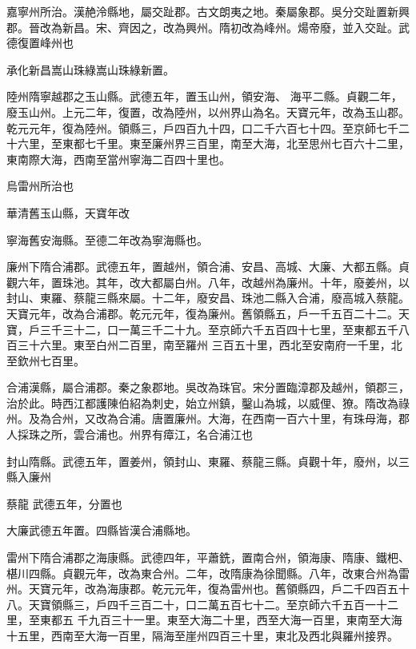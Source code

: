\begin{pinyinscope}
 嘉寧州所治。漢赩泠縣地，屬交趾郡。古文朗夷之地。秦屬象郡。吳分交趾置新興郡。晉改為新昌。宋、齊因之，改為興州。隋初改為峰州。煬帝廢，並入交趾。武德復置峰州也



 承化新昌嵩山珠綠嵩山珠綠新置。



 陸州隋寧越郡之玉山縣。武德五年，置玉山州，領安海、
 海平二縣。貞觀二年，廢玉山州。上元二年，復置，改為陸州，以州界山為名。天寶元年，改為玉山郡。乾元元年，復為陸州。領縣三，戶四百九十四，口二千六百七十四。至京師七千二十六里，至東都七千里。東至廉州界三百里，南至大海，北至思州七百六十二里，東南際大海，西南至當州寧海二百四十里也。



 烏雷州所治也



 華清舊玉山縣，天寶年改



 寧海舊安海縣。至德二年改為寧海縣也。



 廉州下隋合浦郡。武德五年，置越州，領合浦、安昌、高城、大廉、大都五縣。貞觀六年，置珠池。其年，改大都屬白州。八年，改越州為廉州。十年，廢姜州，以封山、東羅、蔡龍三縣來屬。十二年，廢安昌、珠池二縣入合浦，廢高城入蔡龍。天寶元年，改為合浦郡。乾元元年，復為廉州。舊領縣五，戶一千五百二十二。天寶，戶三千三十二，口一萬三千二十九。至京師六千五百四十七里，至東都五千八百三十六里。東至白州二百里，南至羅州
 三百五十里，西北至安南府一千里，北至欽州七百里。



 合浦漢縣，屬合浦郡。秦之象郡地。吳改為珠官。宋分置臨漳郡及越州，領郡三，治於此。時西江都護陳伯紹為刺史，始立州鎮，鑿山為城，以威俚、獠。隋改為祿州。及為合州，又改為合浦。唐置廉州。大海，在西南一百六十里，有珠母海，郡人採珠之所，雲合浦也。州界有瘴江，名合浦江也



 封山隋縣。武德五年，置姜州，領封山、東羅、蔡龍三縣。貞觀十年，廢州，以三縣入廉州



 蔡龍
 武德五年，分置也



 大廉武德五年置。四縣皆漢合浦縣地。



 雷州下隋合浦郡之海康縣。武德四年，平蕭銑，置南合州，領海康、隋康、鐵杷、椹川四縣。貞觀元年，改為東合州。二年，改隋康為徐聞縣。八年，改東合州為雷州。天寶元年，改為海康郡。乾元元年，復為雷州也。舊領縣四，戶二千四百五十八。天寶領縣三，戶四千三百二十，口二萬五百七十二。至京師六千五百一十二里，至東都五
 千九百三十一里。東至大海二十里，西至大海一百里，東南至大海十五里，西南至大海一百里，隔海至崖州四百三十里，東北及西北與羅州接界。




\end{pinyinscope}
